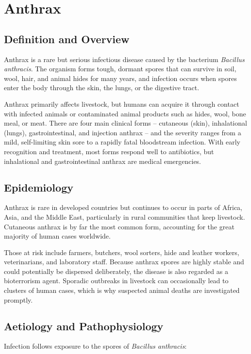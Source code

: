 \chapter{Anthrax}

\section*{Definition and Overview}
Anthrax is a rare but serious infectious disease caused by the bacterium \textit{Bacillus anthracis}. The organism forms tough, dormant spores that can survive in soil, wool, hair, and animal hides for many years, and infection occurs when spores enter the body through the skin, the lungs, or the digestive tract.

Anthrax primarily affects livestock, but humans can acquire it through contact with infected animals or contaminated animal products such as hides, wool, bone meal, or meat. There are four main clinical forms -- cutaneous (skin), inhalational (lungs), gastrointestinal, and injection anthrax -- and the severity ranges from a mild, self-limiting skin sore to a rapidly fatal bloodstream infection. With early recognition and treatment, most forms respond well to antibiotics, but inhalational and gastrointestinal anthrax are medical emergencies.

\section*{Epidemiology}
Anthrax is rare in developed countries but continues to occur in parts of Africa, Asia, and the Middle East, particularly in rural communities that keep livestock. Cutaneous anthrax is by far the most common form, accounting for the great majority of human cases worldwide.

Those at risk include farmers, butchers, wool sorters, hide and leather workers, veterinarians, and laboratory staff. Because anthrax spores are highly stable and could potentially be dispersed deliberately, the disease is also regarded as a bioterrorism agent. Sporadic outbreaks in livestock can occasionally lead to clusters of human cases, which is why suspected animal deaths are investigated promptly.

\section*{Aetiology and Pathophysiology}
Infection follows exposure to the spores of \textit{Bacillus anthracis}:

